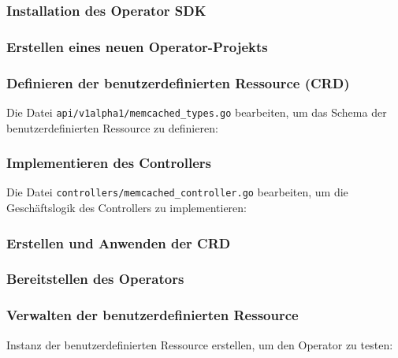 \subsubsection{Installation des Operator SDK}


\subsubsection{Erstellen eines neuen Operator-Projekts}


\subsubsection{Definieren der benutzerdefinierten Ressource (CRD)}

Die Datei \texttt{api/v1alpha1/memcached\_types.go} bearbeiten, um das Schema der benutzerdefinierten Ressource zu definieren:

\newpage
\subsubsection{Implementieren des Controllers}
Die Datei \texttt{controllers/memcached\_controller.go} bearbeiten, um die Geschäftslogik des Controllers zu implementieren:


\subsubsection{Erstellen und Anwenden der CRD}


\subsubsection{Bereitstellen des Operators}


\subsubsection{Verwalten der benutzerdefinierten Ressource}
Instanz der benutzerdefinierten Ressource erstellen, um den Operator zu testen:

